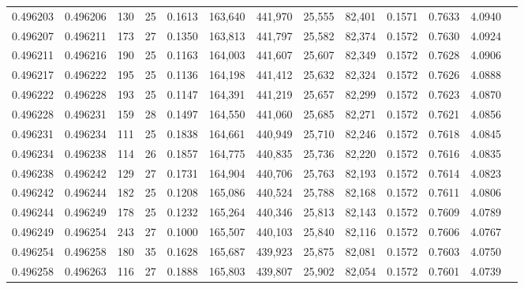 \begin{tabular}{rrrrrrrrrrrrr}
0.496203 & 0.496206 & 130 &  25 &                                     0.1613 & 163,640 & 441,970 &  25,555 &  82,401 & 0.1571 & 0.7633 & 4.0940 \\
0.496207 & 0.496211 & 173 &  27 &                                     0.1350 & 163,813 & 441,797 &  25,582 &  82,374 & 0.1572 & 0.7630 & 4.0924 \\
0.496211 & 0.496216 & 190 &  25 &                                     0.1163 & 164,003 & 441,607 &  25,607 &  82,349 & 0.1572 & 0.7628 & 4.0906 \\
0.496217 & 0.496222 & 195 &  25 &                                     0.1136 & 164,198 & 441,412 &  25,632 &  82,324 & 0.1572 & 0.7626 & 4.0888 \\
0.496222 & 0.496228 & 193 &  25 &                                     0.1147 & 164,391 & 441,219 &  25,657 &  82,299 & 0.1572 & 0.7623 & 4.0870 \\
0.496228 & 0.496231 & 159 &  28 &                                     0.1497 & 164,550 & 441,060 &  25,685 &  82,271 & 0.1572 & 0.7621 & 4.0856 \\
0.496231 & 0.496234 & 111 &  25 &                                     0.1838 & 164,661 & 440,949 &  25,710 &  82,246 & 0.1572 & 0.7618 & 4.0845 \\
0.496234 & 0.496238 & 114 &  26 &                                     0.1857 & 164,775 & 440,835 &  25,736 &  82,220 & 0.1572 & 0.7616 & 4.0835 \\
0.496238 & 0.496242 & 129 &  27 &                                     0.1731 & 164,904 & 440,706 &  25,763 &  82,193 & 0.1572 & 0.7614 & 4.0823 \\
0.496242 & 0.496244 & 182 &  25 &                                     0.1208 & 165,086 & 440,524 &  25,788 &  82,168 & 0.1572 & 0.7611 & 4.0806 \\
0.496244 & 0.496249 & 178 &  25 &                                     0.1232 & 165,264 & 440,346 &  25,813 &  82,143 & 0.1572 & 0.7609 & 4.0789 \\
0.496249 & 0.496254 & 243 &  27 &                                     0.1000 & 165,507 & 440,103 &  25,840 &  82,116 & 0.1572 & 0.7606 & 4.0767 \\
0.496254 & 0.496258 & 180 &  35 &                                     0.1628 & 165,687 & 439,923 &  25,875 &  82,081 & 0.1572 & 0.7603 & 4.0750 \\
0.496258 & 0.496263 & 116 &  27 &                                     0.1888 & 165,803 & 439,807 &  25,902 &  82,054 & 0.1572 & 0.7601 & 4.0739 \\

\end{tabular}
